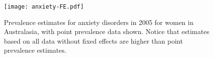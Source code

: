    \begin{figure}[h]
        \begin{center}
            \texttt{[image: anxiety-FE.pdf]}
            \caption{Prevalence estimates for anxiety disorders in 2005 for women in Australasia, with point prevalence data shown.  Notice that estimates based on all data without fixed effects are higher than point prevalence estimates.}
            \label{fig:app-anxiety FE}
        \end{center}
    \end{figure}
    
